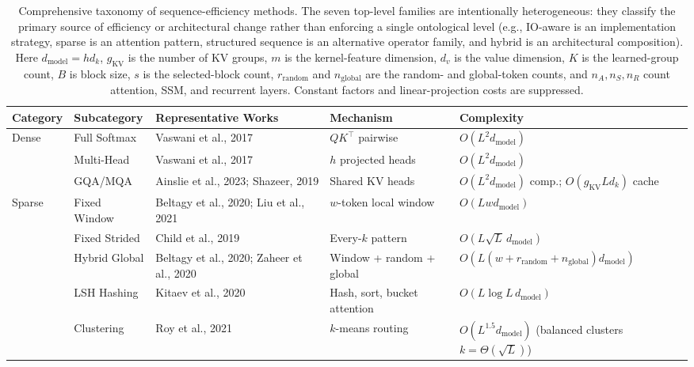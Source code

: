 \documentclass[10pt,twocolumn]{article}
\newif\ifshrinkfloats
\newcommand{\sflt}[2]{\ifshrinkfloats#1\else#2\fi}
\begin{document}
\begin{table}[!tbp]
\centering
\sflt{\fontsize{7}{8.4}\selectfont}{\scriptsize}
\renewcommand{\arraystretch}{\sflt{1.0}{1.05}}
\caption{Comprehensive taxonomy of sequence-efficiency methods. The seven top-level families are intentionally heterogeneous: they classify the primary source of efficiency or architectural change rather than enforcing a single ontological level (e.g., IO-aware is an implementation strategy, sparse is an attention pattern, structured sequence is an alternative operator family, and hybrid is an architectural composition). Here $d_{\mathrm{model}}=h d_k$, $g_{\mathrm{KV}}$ is the number of KV groups, $m$ is the kernel-feature dimension, $d_v$ is the value dimension, $K$ is the learned-group count, $B$ is block size, $s$ is the selected-block count, $r_{\mathrm{random}}$ and $n_{\mathrm{global}}$ are the random- and global-token counts, and $n_A,n_S,n_R$ count attention, SSM, and recurrent layers. Constant factors and linear-projection costs are suppressed.}
\label{tab:deep-taxonomy}
\begin{tabular}{p{2.3cm}p{2.2cm}p{2.2cm}p{2.8cm}p{2.0cm}}
\toprule
Category & Subcategory & Representative Works & Mechanism & Complexity \\
\midrule
\multirow{3}{2.3cm}{Dense} & Full Softmax & Vaswani et al., 2017 & $QK^{\top}$ pairwise & $O(L^2d_{\mathrm{model}})$ \\
 & Multi-Head & Vaswani et al., 2017 & $h$ projected heads & $O(L^2d_{\mathrm{model}})$ \\
 & GQA/MQA & Ainslie et al., 2023; Shazeer, 2019 & Shared KV heads & $O(L^2d_{\mathrm{model}})$ comp.; $O(g_{\mathrm{KV}}Ld_k)$ cache \\
\midrule
\multirow{5}{2.3cm}{Sparse} & Fixed Window & Beltagy et al., 2020; Liu et al., 2021 & $w$-token local window & $O(Lwd_{\mathrm{model}})$ \\
 & Fixed Strided & Child et al., 2019 & Every-$k$ pattern & $O(L\sqrt{L}\,d_{\mathrm{model}})$ \\
 & Hybrid Global & Beltagy et al., 2020; Zaheer et al., 2020 & Window + random + global & $O(L(w+r_{\mathrm{random}}+n_{\mathrm{global}})d_{\mathrm{model}})$ \\
 & LSH Hashing & Kitaev et al., 2020 & Hash, sort, bucket attention & $O(L\log L\,d_{\mathrm{model}})$ \\
 & Clustering & Roy et al., 2021 & $k$-means routing & $O(L^{1.5}d_{\mathrm{model}})$ (balanced clusters $k=\Theta(\sqrt{L})$) \\

\end{tabular}
\end{table}
\end{document}
